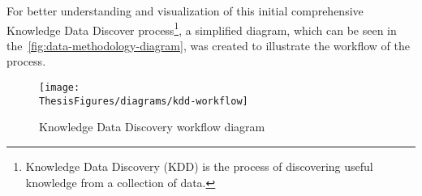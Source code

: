 For better understanding and visualization of this initial comprehensive Knowledge Data Discover process\footnote{
	Knowledge Data Discovery (KDD) is the process of discovering useful knowledge from a collection of data\cite{uord_kdd_1_kdd}.
}, a simplified diagram, which can be seen in the~\autoref{fig:data-methodology-diagram}, was created to illustrate the workflow of the process.

\begin{figure}[h]
	\centering
	\texttt{[image: \\ThesisFigures/diagrams/kdd-workflow]}
	\caption{Knowledge Data Discovery workflow diagram}
	\label{fig:data-methodology-diagram}
\end{figure}
